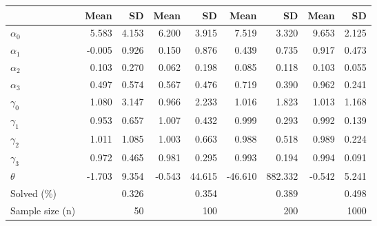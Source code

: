 
\begin{tabular}[t]{lrrrrrrrr}
\toprule
  & Mean & SD & Mean  & SD  & Mean   & SD   & Mean    & SD   \\
\midrule
$\alpha_{0}$ & 5.583 & 4.153 & 6.200 & 3.915 & 7.519 & 3.320 & 9.653 & 2.125\\
$\alpha_{1}$ & -0.005 & 0.926 & 0.150 & 0.876 & 0.439 & 0.735 & 0.917 & 0.473\\
$\alpha_{2}$ & 0.103 & 0.270 & 0.062 & 0.198 & 0.085 & 0.118 & 0.103 & 0.055\\
$\alpha_{3}$ & 0.497 & 0.574 & 0.567 & 0.476 & 0.719 & 0.390 & 0.962 & 0.241\\
$\gamma_{0}$ & 1.080 & 3.147 & 0.966 & 2.233 & 1.016 & 1.823 & 1.013 & 1.168\\
$\gamma_{1}$ & 0.953 & 0.657 & 1.007 & 0.432 & 0.999 & 0.293 & 0.992 & 0.139\\
$\gamma_{2}$ & 1.011 & 1.085 & 1.003 & 0.663 & 0.988 & 0.518 & 0.989 & 0.224\\
$\gamma_{3}$ & 0.972 & 0.465 & 0.981 & 0.295 & 0.993 & 0.194 & 0.994 & 0.091\\
$\theta$ & -1.703 & 9.354 & -0.543 & 44.615 & -46.610 & 882.332 & -0.542 & 5.241\\
Solved (\%) &  & 0.326 &  & 0.354 &  & 0.389 &  & 0.498\\
Sample size (n) &  & 50 &  & 100 &  & 200 &  & 1000\\
\bottomrule
\end{tabular}
